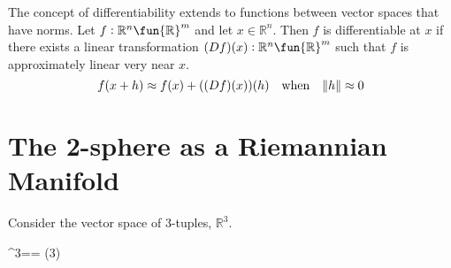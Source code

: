 \documentclass[11pt, oneside]{article}
\newcommand{\R}{{\mathbb{R}}}
\newcommand{\Rtuples}{\R}
\newcommand{\Rthree}{\R^3}
\begin{document}
The concept of differentiability extends to functions between vector spaces that have norms.
Let $f: \R^n \fun \R^m$ and let $x \in \R^n$.
Then $f$ is differentiable at $x$ if there exists a linear transformation $(Df)(x): \R^n \fun \R^m$
such that $f$ is approximately linear very near $x$.
$$
f(x + h) \approx f(x) + ((Df)(x))(h) \quad \text{when} \quad \norm{h} \approx 0
$$ 

\section{The 2-sphere as a Riemannian Manifold}

Consider the vector space of 3-tuples, $\Rthree$.
\begin{zed}
	\Rthree == \Rtuples(3)
\end{zed}
\end{document}
